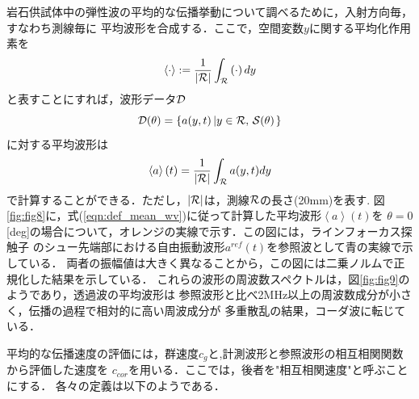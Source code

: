 岩石供試体中の弾性波の平均的な伝播挙動について調べるために，入射方向毎，すなわち測線毎に
平均波形を合成する．ここで，空間変数$y$に関する平均化作用素を
\begin{equation}
	\left< \cdot \right> := 
	\frac{1}{ \left| {\cal R} \right| }\int_{\cal R}\left( \cdot \right)dy
	\label{eqn:averaging}
\end{equation}
と表すことにすれば，波形データ${\cal D}$
\begin{equation}
	{\cal D}(\theta)=\left\{ a(y,t) \left| y\in {\cal R}, \, {\cal S}(\theta)\right.\right\}
	\label{eqn:}
\end{equation}
に対する平均波形は
\begin{equation}
	\left< a\right>(t)=
	\frac{1}{\left| {\cal R}\right|}\int_{\cal R}a(y,t)dy
	\label{eqn:def_mean_wv}
\end{equation}
で計算することができる．ただし，$\left| {\cal R }\right|$は，測線$\cal R$の長さ(20mm)を表す.
図\ref{fig:fig8}に，式(\ref{eqn:def_mean_wv})に従って計算した平均波形$\left<a \right>(t)$を
$\theta=0$[deg]の場合について，オレンジの実線で示す．この図には，ラインフォーカス探触子
のシュー先端部における自由振動波形$a^{ref}(t)$を参照波として青の実線で示している．
両者の振幅値は大きく異なることから，この図には二乗ノルムで正規化した結果を示している．
これらの波形の周波数スペクトルは，図\ref{fig:fig9}のようであり，透過波の平均波形は
参照波形と比べ2MHz以上の周波数成分が小さく，伝播の過程で相対的に高い周波成分が
多重散乱の結果，コーダ波に転じている．

平均的な伝播速度の評価には，群速度$c_g$と,計測波形と参照波形の相互相関関数から評価した速度を
$c_{cor}$を用いる．ここでは，後者を"相互相関速度"と呼ぶことにする．
各々の定義は以下のようである．
